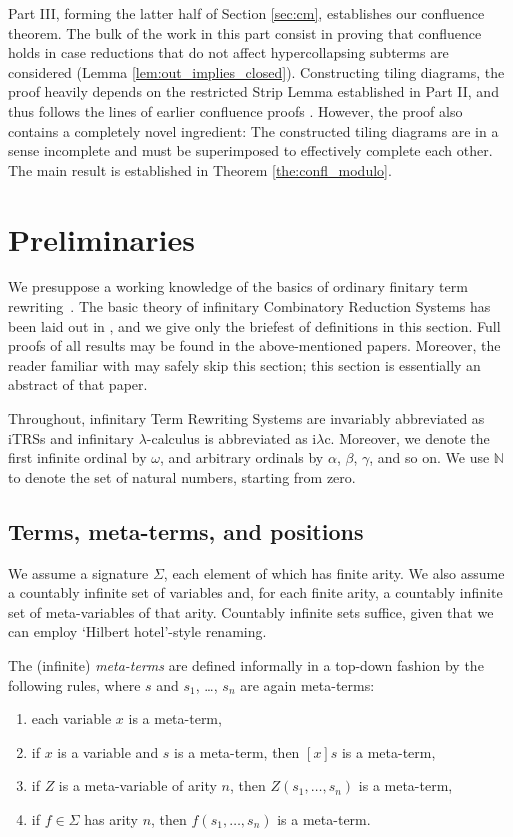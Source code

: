 \documentclass{LMCS}
\theoremstyle{plain}
\theoremstyle{definition}
\newcommand{\natnum}{\mathbb{N}}
\newcommand{\iLC}{i$\lambda$c\xspace}
\begin{document}
Part III, forming the latter half of Section \ref{sec:cm}, establishes our confluence theorem. The bulk of the work in this part consist in proving that confluence holds in case reductions that do not affect hypercollapsing subterms are considered (Lemma \ref{lem:out_implies_closed}). Constructing tiling diagrams, the proof heavily depends on the restricted Strip Lemma established in Part II, and thus follows the lines of earlier confluence proofs \cite{T03}. However, the proof also contains a completely novel ingredient: The constructed tiling diagrams are in a sense incomplete and must be superimposed to effectively complete each other. The main result is established in Theorem \ref{the:confl_modulo}.


\section{Preliminaries}
\label{sec:preliminaries}



\noindent We presuppose a working knowledge of the basics of ordinary
finitary term rewriting~\cite{T03}. The basic theory of infinitary
Combinatory Reduction Systems has been laid out in \cite{JJ05a,JJ05b},
and we give only the briefest of definitions in this section. Full
proofs of all results may be found in the above-mentioned
papers. Moreover, the reader familiar with \cite{paper_i} may safely
skip this section; this section is essentially an abstract of that
paper.

Throughout, infinitary Term Rewriting Systems are invariably abbreviated as iTRSs and infinitary $\lambda$-calculus is abbreviated as \iLC. Moreover, we denote the first infinite ordinal by $\omega$, and arbitrary ordinals by $\alpha$, $\beta$, $\gamma$, and so on. We use $\natnum$ to denote the set of natural numbers, starting from zero.

\subsection{Terms, meta-terms, and positions}

We assume a signature $\Sigma$, each element of which has finite arity. We also assume a countably infinite set of variables and, for each finite arity, a countably infinite set of meta-variables of that arity. Countably infinite sets suffice, given that we can employ `Hilbert hotel'-style renaming. 

The (infinite) \emph{meta-terms} are defined informally in a top-down fashion by the following rules, where $s$ and $s_1$, \ldots, $s_n$ are again meta-terms:
\begin{enumerate}[(1)]
\item
each variable $x$ is a meta-term,
\item
if $x$ is a variable and $s$ is a meta-term, then $[x] s$ is a meta-term,
\item
if $Z$ is a meta-variable of arity $n$, then $Z(s_1, \ldots, s_n)$ is a meta-term,
\item
if $f \in \Sigma$ has arity $n$, then $f(s_1, \ldots, s_n)$ is a meta-term.
\end{enumerate}
\end{document}
